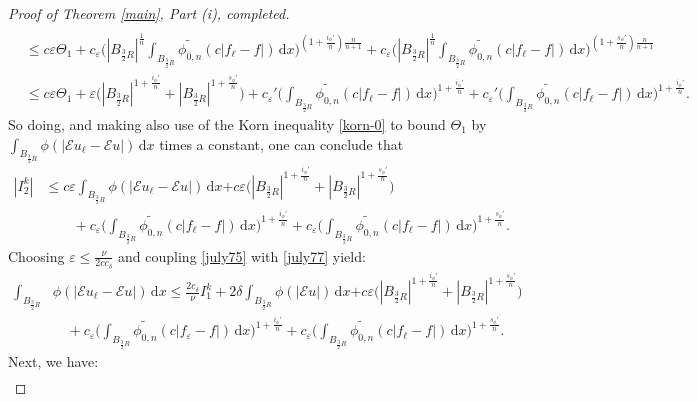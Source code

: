 \documentclass[leqno,11pt]{amsart}%
\numberwithin{equation}{section}
\newcommand{\eps}{\varepsilon}
\def\d{\mathrm{d}}
\def\E{\mathcal{E}}
\def\dx{\d x}
\theoremstyle{definition}
\numberwithin{equation}{section}
\begin{document}
\begin{proof}[Proof of Theorem \ref{main}, Part (i), completed]
{\begin{align}
\\ \nonumber &
\leq c \varepsilon \Theta_1 + c_\varepsilon \bigg(|B_{\frac{3}{2}R}|^{\frac 1n}\int_{B_{\frac{3}{2}R}} \widetilde{\phi_{0,n}}(c|f_\ell-f|)\,\dx\bigg)^{(1+\frac{{i_\phi'}}{n}) {\frac{n}{n+1}}} + c_\varepsilon \bigg(|B_{\frac{3}{2}R}|^{\frac 1n}\int_{B_{\frac{3}{2}R}} \widetilde{\phi_{0,n}}(c|f_\ell-f|)\,\dx\bigg)^{(1+\frac{ {s_\phi'}}{n}) {\frac{n}{n+1}}}\\\nonumber
& {
\le
c\varepsilon\Theta_1
+
\varepsilon \Big(|B_{\frac{3}{2}R}|^{1+\frac{i_\phi'}{n}}
+|B_{\frac{3}{2}R}|^{1+\frac{s_\phi'}{n}}\Big)
+
c_\eps' \bigg(\int_{B_{\frac{3}{2}R}} \widetilde{\phi_{0,n}}(c|f_\ell-f|)\,\dx\bigg)^{1+\frac{{i_\phi'}}{n}}
+
c_\eps '\bigg(\int_{B_{\frac{3}{2}R}} \widetilde{\phi_{0,n}}(c|f_\ell-f|)\,\dx\bigg)^{1+\frac{{i_\phi'}}{n}}
}.
\end{align} 
So doing, and making also use of the Korn inequality \eqref{korn-0} to bound $\Theta_1$ by 
$\int_{B_{\frac{3}{2}R}}\phi (|\E  u_\ell-\E u|)\, \d x $ times a constant, one can conclude that
\begin{align}\label{july77}
    |I_2^k|
    & \le
      c\eps \int_{B_{\frac{3}{2}R}}\phi (|\E  u_\ell-\E u|)\, \d x
     {
     +c\eps\big(|B_{\frac{3}{2}R}|^{1+\frac{{i_\phi'}}{n}}+|B_{\frac{3}{2}R}|^{1+\frac{{s_\phi'}}{n}}\big)
     }
     \\ \nonumber & \quad\quad 
     + 
     c_\eps\bigg( \int_{B_{\frac{3}{2}R}}\widetilde{\phi_{0,n}}(c|f_\ell-f|)\,\dx\bigg)^{1+\frac{ {i_\phi'}}{n}}
     +
     c_\eps\bigg( \int_{B_{\frac{3}{2}R}} \widetilde{\phi_{0,n}}(c|f_\ell-f|)\,\dx\bigg)^{1+\frac{{s_\phi'}}{n}}.
     \end{align}
     Choosing $\varepsilon \leq \frac{\nu}{2cc_\delta}$  and coupling \eqref{july75} with \eqref{july77} yield:
\begin{align}
    \label{july78}
     \int_{B_{\frac{3}{2}R}}&\phi (|\E u_\ell-\E u|)\, \d x  \leq \frac{2c_\delta}{\nu}I_1^k+
     2\delta \int_{B_{\frac{3}{2}R}}\phi (|\E u|)\, \d x
    {
     +c\eps\big(|B_{\frac{3}{2}R}|^{1+\frac{{i_\phi'}}{n}}+|B_{\frac{3}{2}R}|^{1+\frac{ {s_\phi'}}{n}}\big)
     }
     \\ \nonumber & \quad + 
     c_\eps\bigg( \int_{B_{\frac{3}{2}R}}\widetilde{\phi_{0,n}}(c|f_\varepsilon-f|)\,\dx\bigg)^{1+\frac{ {i_\phi'}}{n}}
     +
     c_\eps\bigg( \int_{B_{\frac{3}{2}R}} \widetilde{\phi_{0,n}}(c|f_\ell-f|)\,\dx\bigg)^{1+\frac{{s_\phi'}}{n}}.
\end{align}
Next, we have:
\begin{align}

\end{align}}
\end{proof}
\end{document}
